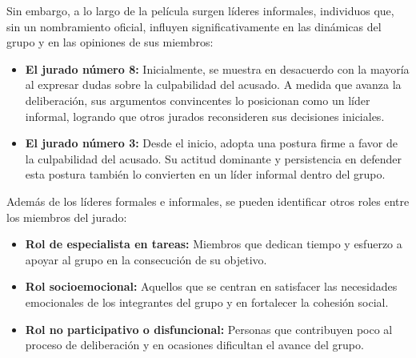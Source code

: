 \documentclass{article}
\begin{document}
Sin embargo, a lo largo de la película surgen líderes informales, individuos que, sin un nombramiento oficial, influyen significativamente en las dinámicas del grupo y en las opiniones de sus miembros:

\begin{itemize}
    \item \textbf{El jurado número 8:} Inicialmente, se muestra en desacuerdo con la mayoría al expresar dudas sobre la culpabilidad del acusado. A medida que avanza la deliberación, sus argumentos convincentes lo posicionan como un líder informal, logrando que otros jurados reconsideren sus decisiones iniciales.
    \item \textbf{El jurado número 3:} Desde el inicio, adopta una postura firme a favor de la culpabilidad del acusado. Su actitud dominante y persistencia en defender esta postura también lo convierten en un líder informal dentro del grupo.
\end{itemize}

Además de los líderes formales e informales, se pueden identificar otros roles entre los miembros del jurado:

\begin{itemize}
    \item \textbf{Rol de especialista en tareas:} Miembros que dedican tiempo y esfuerzo a apoyar al grupo en la consecución de su objetivo. 
    \item \textbf{Rol socioemocional:} Aquellos que se centran en satisfacer las necesidades emocionales de los integrantes del grupo y en fortalecer la cohesión social.
    \item \textbf{Rol no participativo o disfuncional:} Personas que contribuyen poco al proceso de deliberación y en ocasiones dificultan el avance del grupo.
\end{itemize}
\end{document}
